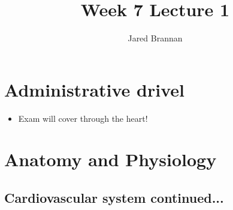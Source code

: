 \documentclass{article}
\title{Week 7 Lecture 1}
\author{Jared Brannan }
\theoremstyle{definition}
\begin{document}
\maketitle

\section{Administrative drivel}
\begin{itemize}
	\item Exam will cover through the heart!
\end{itemize}

\section{Anatomy and Physiology}

\subsection{Cardiovascular system continued...}
\end{document}
